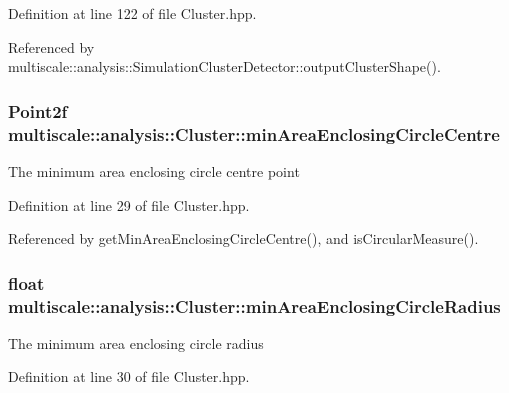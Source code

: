 \-Definition at line 122 of file \-Cluster.\-hpp.



\-Referenced by multiscale\-::analysis\-::\-Simulation\-Cluster\-Detector\-::output\-Cluster\-Shape().

\hypertarget{classmultiscale_1_1analysis_1_1Cluster_a47e672060b4025dcd07ebb9c5fd99f0c}{
\subsubsection[{min\-Area\-Enclosing\-Circle\-Centre}]{\setlength{\rightskip}{0pt plus 5cm}\-Point2f {\bf multiscale\-::analysis\-::\-Cluster\-::min\-Area\-Enclosing\-Circle\-Centre}}}\label{classmultiscale_1_1analysis_1_1Cluster_a47e672060b4025dcd07ebb9c5fd99f0c}
\-The minimum area enclosing circle centre point 

\-Definition at line 29 of file \-Cluster.\-hpp.



\-Referenced by get\-Min\-Area\-Enclosing\-Circle\-Centre(), and is\-Circular\-Measure().

\hypertarget{classmultiscale_1_1analysis_1_1Cluster_a070994481884a4c7f5aa4879ce7b0568}{
\subsubsection[{min\-Area\-Enclosing\-Circle\-Radius}]{\setlength{\rightskip}{0pt plus 5cm}float {\bf multiscale\-::analysis\-::\-Cluster\-::min\-Area\-Enclosing\-Circle\-Radius}}}\label{classmultiscale_1_1analysis_1_1Cluster_a070994481884a4c7f5aa4879ce7b0568}
\-The minimum area enclosing circle radius 

\-Definition at line 30 of file \-Cluster.\-hpp.



